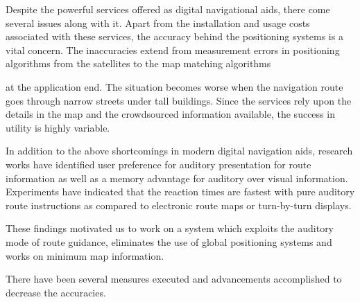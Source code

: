 \documentclass[letter]{sig-alternate}
\begin{document}
Despite the powerful services offered as digital navigational aids, there come several issues along with it. Apart from the installation and usage costs associated with these services, the accuracy behind the positioning systems is a vital concern. The inaccuracies extend from measurement errors in positioning algorithms from the satellites to the map matching algorithms 
\iffalse 
[D.K. Yang, B.G. Cai and Y.F. Yuan,An Improved Map-Matching Algorithm Used in Vehicle Navigation System]
\fi
 at the application end. The situation becomes worse when the navigation route goes through narrow streets under tall buildings. Since the services rely upon the details in the map and the crowdsourced information available, the success in utility is highly variable. 
  
In addition to the above shortcomings in modern digital navigation aids, research works have identified user preference for auditory presentation for route information as well as a memory advantage for auditory over visual information. Experiments have indicated that the reaction times are fastest with pure auditory route instructions as compared to electronic route maps or turn-by-turn displays. 
\iffalse
[Driving with navigational instructions:
Investigating user behaviour and
performance

Individual differences in navigational strategy:
             implications for display design
                      Carryl L. Baldwin*
Psychology Department, George Mason University, Fairfax, VA, USA
]

For fast reaction:
R. Srinivasan, P.P. Jovanis
Effect of selected in-vehicle route guidance systems on driver reaction times
Human Factors, 39 (2) (1997), pp. 200–215
R. Srinivasan, P.P. Jovanis
Effect of in-vehicle route guidance systems on driver workload and choice of vehicle speed: Findings from a driving simulator experiment
\fi

These findings motivated us to work on a system which exploits the auditory mode of route guidance, eliminates the use of global positioning systems and works on minimum map information.
  

 There have been several measures executed and advancements accomplished to decrease the accuracies.
    
\end{document}
